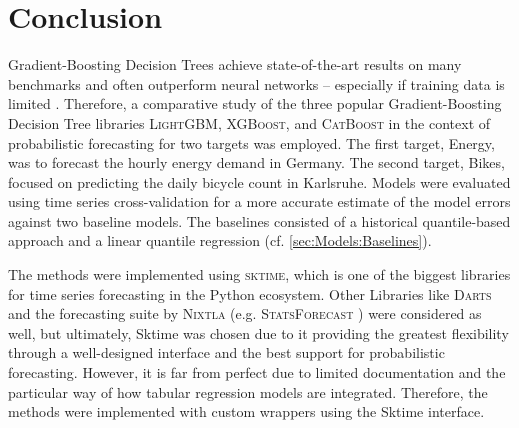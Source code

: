 \newpage
\section{Conclusion}
\label{ch:Conclusion}

Gradient-Boosting Decision Trees achieve state-of-the-art results on many benchmarks and often outperform neural networks -- especially if training data is limited \parencites{shwartz-ziv_tabular_2021, grinsztajn_why_2022}. Therefore, a comparative study of the three popular Gradient-Boosting Decision Tree libraries \textsc{LightGBM}, \textsc{XGBoost}, and \textsc{CatBoost} in the context of probabilistic forecasting for two targets was employed. The first target, Energy, was to forecast the hourly energy demand in Germany. The second target, Bikes, focused on predicting the daily bicycle count in Karlsruhe. Models were evaluated using time series cross-validation for a more accurate estimate of the model errors against two baseline models. The baselines consisted of a historical quantile-based approach and a linear quantile regression (cf. \cref{sec:Models:Baselines}).

The methods were implemented using \textsc{sktime}, which is one of the biggest libraries for time series forecasting in the Python ecosystem. Other Libraries like \textsc{Darts} \parencite{herzen_darts_2022} and the forecasting suite by \textsc{Nixtla} (e.g. \textsc{StatsForecast} \parencite{azul_garza_statsforecast_2022}) were considered as well, but ultimately, Sktime was chosen due to it providing the greatest flexibility through a well-designed interface and the best support for probabilistic forecasting. However, it is far from perfect due to limited documentation and the particular way of how tabular regression models are integrated. Therefore, the methods were implemented with custom wrappers using the Sktime interface.

